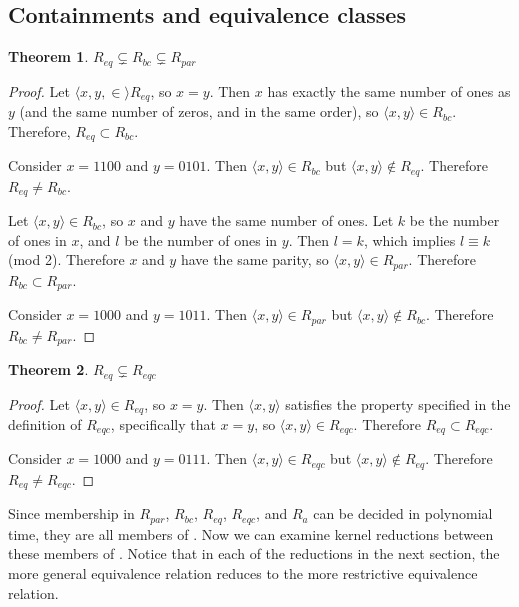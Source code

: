 \documentclass{article}
\newtheorem{theorem}{Theorem}[section]
\theoremstyle{definition} \newtheorem{definition}[definition]{Definition}
\newcommand{\pair}[2]{\langle#1,#2\rangle} %
\begin{document}
\subsection{Containments and equivalence classes}

\begin{theorem}$R_{eq} \subsetneq R_{bc} \subsetneq R_{par}$\end{theorem}
\begin{proof}
  Let $\pair{x, y}\in R_{eq}$, so $x=y$. Then $x$ has exactly the same number
  of ones as $y$ (and the same number of zeros, and in the same order), so
  $\pair{x}{y}\in R_{bc}$. Therefore, $R_{eq} \subset R_{bc}$.
 
  Consider $x=1100$ and $y=0101$. Then $\pair{x}{y}\in R_{bc}$ but $\pair{x}{y}
  \notin R_{eq}$. Therefore $R_{eq} \neq R_{bc}$.

  Let $\pair{x}{y}\in R_{bc}$, so $x$ and $y$ have the same number of ones. Let
  $k$ be the number of ones in $x$, and $l$ be the number of ones in $y$. Then
  $l=k$, which implies $l \equiv k$ (mod 2). Therefore $x$ and $y$ have the
  same parity, so $\pair{x}{y}\in R_{par}$. Therefore $R_{bc} \subset R_{par}$.

  Consider $x=1000$ and $y=1011$. Then $\pair{x}{y}\in R_{par}$ but
  $\pair{x}{y} \notin R_{bc}$. Therefore $R_{bc} \neq R_{par}$.
\end{proof}

\begin{theorem}$R_{eq} \subsetneq R_{eqc}$\end{theorem}
\begin{proof}
  Let $\pair{x}{y}\in R_{eq}$, so $x=y$. Then $\pair{x}{y}$ satisfies the
  property specified in the definition of $R_{eqc}$, specifically that $x=y$,
  so $\pair{x}{y} \in R_{eqc}$. Therefore $R_{eq} \subset R_{eqc}$.

  Consider $x=1000$ and $y=0111$. Then $\pair{x}{y}\in R_{eqc}$ but
  $\pair{x}{y} \notin R_{eq}$. Therefore $R_{eq} \neq R_{eqc}$.
\end{proof}

Since membership in $R_{par}$, $R_{bc}$, $R_{eq}$, $R_{eqc}$, and $R_a$ can be
decided in polynomial time, they are all members of \PEq. Now we can examine
kernel reductions between these members of \PEq. Notice that in each of the
reductions in the next section, the more general equivalence relation reduces
to the more restrictive equivalence relation.
\end{document}
